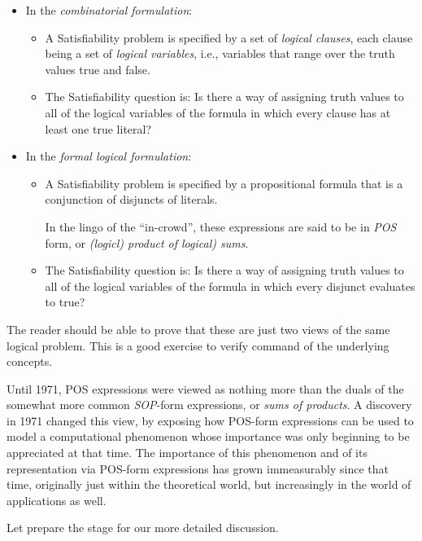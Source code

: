 \begin{itemize}
\item
In the {\it combinatorial formulation}:
  \begin{itemize}
  \item
A Satisfiability problem is specified by a set of {\it logical
  clauses}, each clause being a set of {\it logical variables}, i.e.,
variables that range over the truth values {\small\sf true} and
{\small\sf false}.
  \item
The Satisfiability question is: Is there a way of assigning truth
values to all of the logical variables of the formula in which every
clause has at least one {\small\sf true} literal?
  \end{itemize}
\item
In the {\it formal logical formulation}:
  \begin{itemize}
  \item
A Satisfiability problem is specified by a propositional formula that
is  a conjunction of disjuncts of literals.

In the lingo of the ``in-crowd'', these expressions are said to be in
{\it POS} form,  or {\it (logicl) product
of logical) sums}.
  \item
The Satisfiability question is: Is there a way of assigning truth
values to all of the logical variables of the formula in which every
disjunct evaluates to {\small\sf true}?
  \end{itemize}
\end{itemize}
The reader should be able to prove that these are just two views of
the same logical problem.  {\Arny This is a good exercise to verify
  command of the underlying concepts.}

Until 1971, POS expressions were viewed as nothing more than the duals
of the somewhat more common {\it SOP}-form expressions,
 or {\it sums of products}.  A discovery in
1971 changed this view, by exposing how POS-form expressions can be
used to model a computational phenomenon whose importance was only
beginning to be appreciated at that time.  The importance of this
phenomenon and of its representation via POS-form expressions has
grown immeasurably since that time, originally just within the
theoretical world, but increasingly in the world of applications as
well.

Let prepare the stage for our more detailed discussion.

